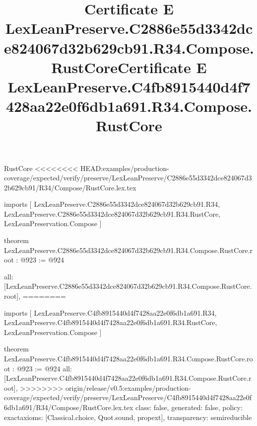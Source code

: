\begin{lexlean}{RustCore}
<<<<<<<< HEAD:examples/production-coverage/expected/verify/preserve/LexLeanPreserve/C2886e55d3342dce824067d32b629cb91/R34/Compose/RustCore.lex.tex
\title{Certificate E LexLeanPreserve.C2886e55d3342dce824067d32b629cb91.R34.Compose.RustCore}
\begin{coremodule}
imports [
  LexLeanPreserve.C2886e55d3342dce824067d32b629cb91.R34,
  LexLeanPreserve.C2886e55d3342dce824067d32b629cb91.R34.RustCore,
  LexLeanPreservation.Compose
]

theorem LexLeanPreserve.C2886e55d3342dce824067d32b629cb91.R34.Compose.RustCore.root : @923 := @924 {
  all: [LexLeanPreserve.C2886e55d3342dce824067d32b629cb91.R34.Compose.RustCore.root],
========
\title{Certificate E LexLeanPreserve.C4fb8915440d4f7428aa22e0f6db1a691.R34.Compose.RustCore}
\begin{coremodule}
imports [
  LexLeanPreserve.C4fb8915440d4f7428aa22e0f6db1a691.R34,
  LexLeanPreserve.C4fb8915440d4f7428aa22e0f6db1a691.R34.RustCore,
  LexLeanPreservation.Compose
]

theorem LexLeanPreserve.C4fb8915440d4f7428aa22e0f6db1a691.R34.Compose.RustCore.root : @923 := @924 {
  all: [LexLeanPreserve.C4fb8915440d4f7428aa22e0f6db1a691.R34.Compose.RustCore.root],
>>>>>>>> origin/release/v0.5:examples/production-coverage/expected/verify/preserve/LexLeanPreserve/C4fb8915440d4f7428aa22e0f6db1a691/R34/Compose/RustCore.lex.tex
  class: false,
  generated: false,
  policy: exact{axioms: [Classical.choice, Quot.sound, propext]},
  transparency: semireducible
}


\end{coremodule}}
\end{coremodule}
\end{lexlean}
